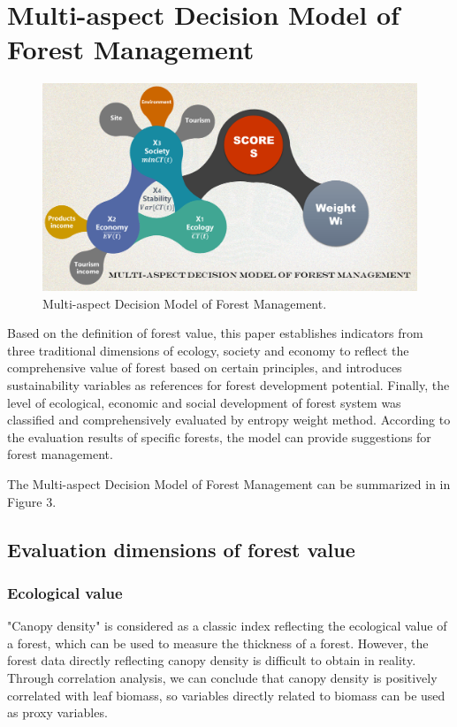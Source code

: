 
\section{Multi-aspect Decision Model of Forest Management}


\begin{figure}[htp]
    \centering
    \includegraphics[width=15cm]{figs/multi_model.png}
    \caption{Multi-aspect Decision Model of Forest Management.}
    \label{fig:my_label}
\end{figure}

Based on the definition of forest value\cite{multi_system}, this paper establishes indicators from three traditional dimensions of ecology, society and economy to reflect the comprehensive value of forest based on certain principles, and introduces sustainability variables as references for forest development potential. Finally, the level of ecological, economic and social development of forest system was classified and comprehensively evaluated by entropy weight method. According to the evaluation results of specific forests, the model can provide suggestions for forest management.

The Multi-aspect Decision Model of Forest Management can be summarized in in Figure 3.

\subsection{Evaluation dimensions of forest value}

\subsubsection{Ecological value}
"Canopy density" is considered as a classic index reflecting the ecological value of a forest, which can be used to measure the thickness of a forest. However, the forest data directly reflecting canopy density is difficult to obtain in reality. Through correlation analysis, we can conclude that canopy density is positively correlated with leaf biomass, so variables directly related to biomass can be used as proxy variables.

